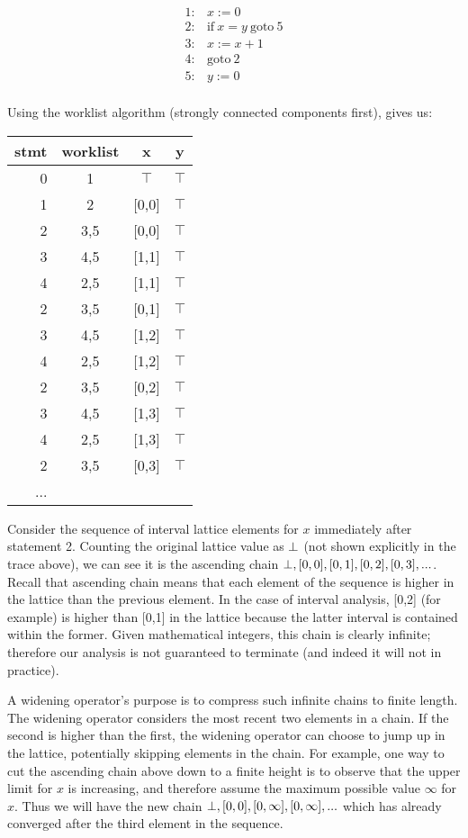 \documentclass[11pt]{article}
\begin{document}
\[
\begin{array}{ll}
1: & x := 0\\
2: & \mbox{if}~x=y~\mbox{goto}~5\\
3: & x := x + 1\\
4: & \mbox{goto}~2\\
5: & y := 0\\
\end{array}
\]

Using the worklist algorithm (strongly connected components first), gives us: 

\begin{center}
\begin{tabular}{r | c | c c}

stmt & worklist & x & y \\
\hline
0  & 1   & $\top$ & $\top$ \\
1  & 2   & [0,0] & $\top$ \\
2  & 3,5 & [0,0] & $\top$ \\
3  & 4,5 & [1,1] & $\top$ \\
4  & 2,5 & [1,1] & $\top$ \\
2  & 3,5 & [0,1] & $\top$ \\
3  & 4,5 & [1,2] & $\top$ \\
4  & 2,5 & [1,2] & $\top$ \\
2  & 3,5 & [0,2] & $\top$ \\
3  & 4,5 & [1,3] & $\top$ \\
4  & 2,5 & [1,3] & $\top$ \\
2  & 3,5 & [0,3] & $\top$ \\
...
\end{tabular}
\end{center}

Consider the sequence of interval lattice elements for $x$ immediately
after statement 2.  Counting the original lattice value as $\bot$ (not shown
explicitly in the trace above), we can see it is the ascending chain $\bot,
[0,0], [0,1], [0,2], [0,3], ...$.  Recall that ascending chain means that each
element of the sequence is higher in the lattice than the previous element.  In
the case of interval analysis, [0,2] (for example) is higher than [0,1] in the
lattice because the latter interval is contained within the former.  Given
mathematical integers, this chain is clearly infinite; therefore our analysis is
not guaranteed to terminate (and indeed it will not in practice).

A widening operator's purpose is to compress such infinite chains to finite
length.  The widening operator considers the most recent two elements in a
chain.  If the second is higher than the first, the widening operator can choose
to jump up in the lattice, potentially skipping elements in the chain.  For
example, one way to cut the ascending chain above down to a finite height is to
observe that the upper limit for $x$ is increasing, and therefore assume the
maximum possible value $\infty$ for $x$.  Thus we will have the new chain
$\bot, [0,0], [0,\infty], [0,\infty], ...$ which has already converged after
the third element in the sequence.
\end{document}
